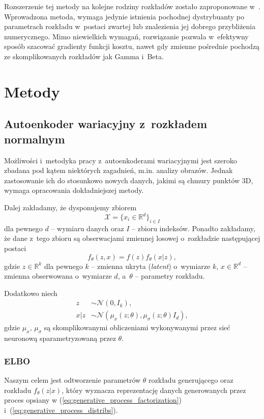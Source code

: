 \documentclass{iithesis}
\begin{document}
Rozszerzenie tej metody na kolejne rodziny rozkładów zostało zaproponowane w~\cite{pathwise_gradients}.
Wprowadzona metoda, wymaga jedynie istnienia pochodnej dystrybuanty po parametrach
rozkładu w~postaci zwartej lub znalezienia jej dobrego przybliżenia numerycznego.
Mimo niewielkich wymagań, rozwiązanie pozwala w~efektywny sposób szacować gradienty funkcji kosztu,
nawet gdy zmienne pośrednie pochodzą ze skomplikowanych rozkładów jak Gamma i~Beta.

\chapter{Metody} \label{sec:methods}
\section{Autoenkoder wariacyjny z~rozkładem normalnym}
\label{sec:vae_normal}
Możliwości i~metodyka pracy z~autoenkoderami wariacyjnymi jest szeroko zbadana
pod kątem niektórych zagadnień, m.in. analizy obrazów.
Jednak zastosowanie ich do stosunkowo nowych danych, jakimi są chmury punktów 3D,
wymaga opracowania dokładniejszej metody.

Dalej zakładamy, że dysponujemy zbiorem
$$
\mathcal{X} = \{x_i \in \mathbb{R}^{d}\}_{i \in I}
$$
dla pewnego $d$ -- wymiaru danych oraz $I$ -- zbioru indeksów.
Ponadto zakładamy, że dane z~tego zbioru są obserwacjami
zmiennej losowej o~rozkładzie następującej postaci
\begin{equation} \label{eq:generative_process_factorization}
f_\theta(z, x) = f(z)f_\theta(x|z),
\end{equation}
gdzie $z \in \mathbb{R}^k$ dla pewnego $k$ -- zmienna ukryta (\textit{latent}) o~wymiarze $k$,
$x \in \mathbb{R}^d$ -- zmienna obserwowana o~wymiarze $d$, a~$\theta$ -- parametry rozkładu.

Dodatkowo niech
\begin{equation} \label{eq:generative_process_distribs}
\begin{split}
z &\sim \mathcal{N}(0, I_k), \\
x|z &\sim \mathcal{N}(\mu_x(z; \theta), \mu_\sigma(z;\theta)I_d),
\end{split}
\end{equation}
gdzie $\mu_x,\,\mu_{\sigma}$ są skomplikowanymi obliczeniami
wykonywanymi przez sieć neuronową sparametryzowaną przez $\theta$.

\subsection{ELBO} \label{sec:elbo}
Naszym celem jest odtworzenie parametrów $\theta$ rozkładu generującego
oraz rozkładu $f_\theta(z|x)$, który wyznacza reprezentację danych
generowanych przez proces opsiany w
(\ref{eq:generative_process_factorization}) i~(\ref{eq:generative_process_distribs}).
\end{document}
